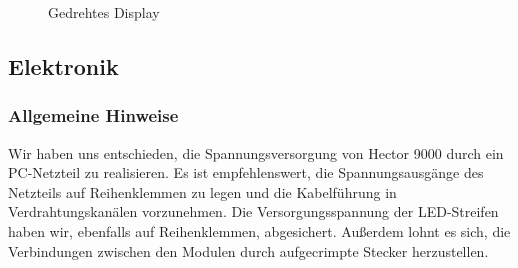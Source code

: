 \documentclass[a4paper]{scrartcl}
\begin{document}
\begin{figure}
 \centering
 \caption{Gedrehtes Display} \label{display_half_in}
\end{figure}

\subsection{Elektronik}

\subsubsection{Allgemeine Hinweise}
Wir haben uns entschieden, die Spannungsversorgung von Hector 9000 durch ein PC-Netzteil zu realisieren. Es ist empfehlenswert, die Spannungsausgänge des Netzteils auf Reihenklemmen zu legen und die Kabelführung in Verdrahtungskanälen vorzunehmen. Die Versorgungsspannung der LED-Streifen haben wir, ebenfalls auf Reihenklemmen, abgesichert. Außerdem lohnt es sich, die Verbindungen zwischen den Modulen durch aufgecrimpte Stecker herzustellen.    
\end{document}
